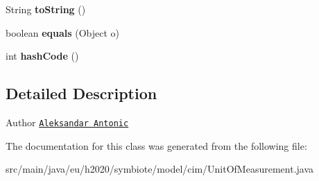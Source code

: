 \begin{DoxyCompactItemize}
String {\bfseries to\+String} ()
\item 
\mbox{\label{classeu_1_1h2020_1_1symbiote_1_1model_1_1cim_1_1UnitOfMeasurement_aca6e5e44239310ba45995bbae1f7d4b0}} 
boolean {\bfseries equals} (Object o)
\item 
\mbox{\label{classeu_1_1h2020_1_1symbiote_1_1model_1_1cim_1_1UnitOfMeasurement_a997abbeea6aca0df6aa5f71d2164bed6}} 
int {\bfseries hash\+Code} ()
\end{DoxyCompactItemize}


\subsection{Detailed Description}
\begin{DoxyAuthor}{Author}
\href{mailto:aleksandar.antonic@fer.hr}{\tt Aleksandar Antonic} 
\end{DoxyAuthor}


The documentation for this class was generated from the following file\+:\begin{DoxyCompactItemize}
\item 
src/main/java/eu/h2020/symbiote/model/cim/Unit\+Of\+Measurement.\+java\end{DoxyCompactItemize}
